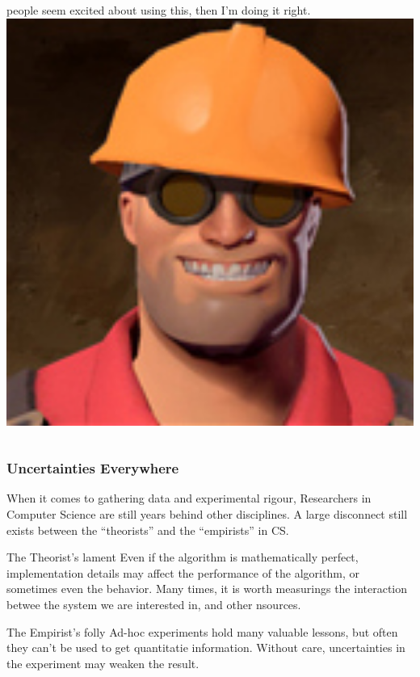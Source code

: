 \documentclass{beamer}
\begin{document}
\begin{frame}
\begin{block}{}
\begin{columns}[c]
      people seem excited about using this, then I'm doing it right.
      \includegraphics[width=1\textwidth]{img/engineer}
    \end{columns}
  \end{block}
\end{frame}

\begin{frame}
  \frametitle{Uncertainties Everywhere} 

  When it comes to gathering data and experimental rigour, Researchers
  in Computer Science are still years behind other disciplines. A
  large disconnect still exists between the ``theorists'' and the
  ``empirists'' in CS.

  {\small
  \begin{block}{The Theorist's lament}
    Even if the algorithm is mathematically perfect, implementation
    details may affect the performance of the algorithm, or sometimes
    even the behavior. Many times, it is worth measurings the
    interaction betwee the system we are interested in, and other
    nsources.
  \end{block}
  \begin{block}{\hfill The Empirist's folly}
    Ad-hoc experiments hold many valuable lessons, but often they
    can't be used to get quantitatie information. Without care,
    uncertainties in the experiment may weaken the result.
  \end{block}}
\end{frame}
\end{document}
